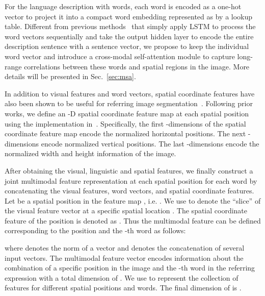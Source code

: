 For the language description with  words, each word  is encoded as a one-hot vector to project it into a compact word embedding represented as  by a lookup table. Different from previous methods~\cite{hu2016segmentation,li2018referring,shi2018key} that simply apply LSTM to process the word vectors sequentially and take the output hidden layer to encode the entire description sentence with a sentence vector, we propose to keep the individual word vector and introduce a cross-modal self-attention module to capture long-range correlations between these words and spatial regions in the image. More details will be presented in Sec.~\ref{sec:msa}.



In addition to visual features and word vectors, spatial coordinate features have also been shown to be useful for referring image segmentation~\cite{hu2016segmentation,li2018referring,liu2017recurrent}. Following prior works, we define an -D spatial coordinate feature map at each spatial position using the implementation in~\cite{liu2017recurrent}. Specifically, the first -dimensions of the spatial coordinate feature map encode the normalized horizontal positions. The next -dimensions encode normalized vertical positions. The last -dimensions encode the normalized width and height information of the image.  



After obtaining the visual, linguistic and spatial features, we finally construct a joint multimodal feature representation at each spatial position for each word by concatenating the visual features, word vectors, and spatial coordinate features. Let  be a spatial position in the feature map , i.e. . We use  to denote the ``slice'' of the visual feature vector at a specific spatial location . The spatial coordinate feature of the position  is denoted as . Thus the multimodal feature  can be defined corresponding to the position  and the -th word as follows:

where  denotes the  norm of a vector and  denotes the concatenation of several input vectors. The multimodal feature vector  encodes information about the combination of a specific position  in the image and the -th word  in the referring expression with a total dimension of . We use  to represent the collection of features  for different spatial positions and words. The final dimension of  is .



